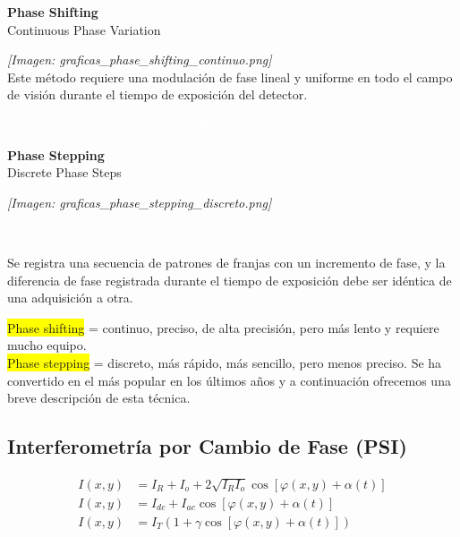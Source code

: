 \documentclass[12pt]{article}
\begin{document}
	\begin{minipage}{0.45\textwidth}
		\begin{center}
			\colorbox{blue!20}{\textbf{Phase Shifting}} \\
			\scriptsize{Continuous Phase Variation}
		\end{center}
		\textit{[Imagen: graficas\_phase\_shifting\_continuo.png]} \\
		Este método requiere una modulación de fase lineal y uniforme en todo el campo de visión durante el tiempo de exposición del detector.
		\begin{center}
			\colorbox{blue!80}{\textcolor{white}{Precise Control \quad Fast Measurement \quad High Accuracy}}
		\end{center}
	\end{minipage}
	\hfill
	\begin{minipage}{0.45\textwidth}
		\begin{center}
			\colorbox{orange!50}{\textbf{Phase Stepping}} \\
			\scriptsize{Discrete Phase Steps}
		\end{center}
		\textit{[Imagen: graficas\_phase\_stepping\_discreto.png]} \\
		\begin{center}
			\colorbox{orange!80}{\textcolor{white}{Simple Setup \quad Slower Process \quad Robust \& Easy}}
		\end{center}
	\end{minipage}
	
	Se registra una secuencia de patrones de franjas con un incremento de fase, y la diferencia de fase registrada durante el tiempo de exposición debe ser idéntica de una adquisición a otra.
	
	\colorbox{yellow}{Phase shifting} = continuo, preciso, de alta precisión, pero más lento y requiere mucho equipo. \\
	\colorbox{yellow}{Phase stepping} = discreto, más rápido, más sencillo, pero menos preciso. Se ha convertido en el más popular en los últimos años y a continuación ofrecemos una breve descripción de esta técnica.
	
	\subsection{Interferometría por Cambio de Fase (PSI)}
	\begin{align*}
		I(x,y) &= I_R + I_o + 2\sqrt{I_R I_o} \cos[\varphi(x,y) + \alpha(t)] \\
		I(x,y) &= I_{dc} + I_{ac} \cos[\varphi(x,y) + \alpha(t)] \\
		I(x,y) &= I_T (1 + \gamma \cos[\varphi(x,y) + \alpha(t)])
	\end{align*}
	
\end{document}
